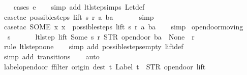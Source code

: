 \begin{isabellebody}
%
\isadelimproof
\ \ %
\endisadelimproof
%
\isatagproof
{}\isamarkupfalse%
\ {\isacharparenleft}cases\ e{\isacharparenright}\isanewline
\ \ \isamarkupfalse%
\ {\isacharparenleft}simp\ add{\isacharcolon}\ ltl{\isacharunderscore}step{\isachardot}simps\ Let{\isacharunderscore}def{\isacharparenright}\isanewline
\ \ \isamarkupfalse%
\ {\isacharparenleft}case{\isacharunderscore}tac\ {\isachardoublequoteopen}possible{\isacharunderscore}steps\ lift\ s\ r\ a\ ba\ {\isacharequal}\ {\isacharbraceleft}{\isacharbar}{\isacharbar}{\isacharbraceright}{\isachardoublequoteclose}{\isacharparenright}\isanewline
\ \ \ \isamarkupfalse%
\ simp\isanewline
\ \ \isamarkupfalse%
\ {\isacharparenleft}case{\isacharunderscore}tac\ {\isachardoublequoteopen}SOME\ x{\isachardot}\ x\ {\isacharbar}{\isasymin}{\isacharbar}\ possible{\isacharunderscore}steps\ lift\ s\ r\ a\ ba{\isachardoublequoteclose}{\isacharparenright}\isanewline
\ \ \isamarkupfalse%
\ simp%
\endisatagproof
{\isafoldproof}%
%
\isadelimproof
\isanewline
%
\endisadelimproof
\isanewline
{}\isamarkupfalse%
\ opendoor{\isacharunderscore}moving{\isacharcolon}\isanewline
\ \ {\isachardoublequoteopen}s\ {\isasymin}\ {\isacharbraceleft}{}{\isacharcomma}\ {}{\isacharcomma}\ {}{\isacharcomma}\ {}{\isacharbraceright}\ {\isasymLongrightarrow}\ ltl{\isacharunderscore}step\ lift\ {\isacharparenleft}Some\ s{\isacharparenright}\ r\ {\isacharparenleft}STR\ {\isacharprime}{\isacharprime}opendoor{\isacharprime}{\isacharprime}{\isacharcomma}\ ba{\isacharparenright}\ {\isacharequal}\ {\isacharparenleft}None{\isacharcomma}\ {\isacharbrackleft}{\isacharbrackright}{\isacharcomma}\ r{\isacharparenright}{\isachardoublequoteclose}\isanewline
%
\isadelimproof
\ \ %
\endisadelimproof
%
\isatagproof
{}\isamarkupfalse%
\ {\isacharparenleft}rule\ ltl{\isacharunderscore}step{\isacharunderscore}none{\isacharparenright}\isanewline
\ \ \isamarkupfalse%
\ {\isacharparenleft}simp\ add{\isacharcolon}\ possible{\isacharunderscore}steps{\isacharunderscore}empty\ lift{\isacharunderscore}def{\isacharparenright}\isanewline
\ \ \isamarkupfalse%
\ {\isacharparenleft}simp\ add{\isacharcolon}\ transitions{\isacharparenright}\isanewline
\ \ \isamarkupfalse%
\ auto%
\endisatagproof
{\isafoldproof}%
%
\isadelimproof
\isanewline
%
\endisadelimproof
\isanewline
{}\isamarkupfalse%
\ label{\isacharunderscore}opendoor{\isacharcolon}\ {\isachardoublequoteopen}ffilter\ {\isacharparenleft}{\isasymlambda}{\isacharparenleft}{\isacharparenleft}origin{\isacharcomma}\ dest{\isacharparenright}{\isacharcomma}\ t{\isacharparenright}{\isachardot}\ Label\ t\ {\isacharequal}\ STR\ {\isacharprime}{\isacharprime}opendoor{\isacharprime}{\isacharprime}{\isacharparenright}\ lift\ {\isacharequal}\isanewline

\end{isabellebody}
